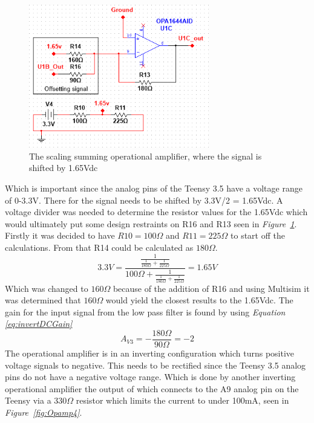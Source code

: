 \begin{figure}[h]
    \centering
    \includegraphics[width=0.70\textwidth]{graphics/OPamp3.png}
    \caption{The scaling summing operational amplifier, where the signal is shifted by 1.65Vdc}
    \label{fig:Opamp3}
\end{figure}


Which is important since the analog pins of the Teensy 3.5 have a voltage range of 0-3.3V.
There for the signal needs to be shifted by 3.3V/2 = 1.65Vdc.
A voltage divider was needed to determine the resistor values for the 1.65Vdc which would ultimately put some design restraints on R16 and R13 seen in \textit{Figure~\ref{fig:Opamp3}}.
Firstly it was decided to have $R10 = 100\Omega$  and $R11 = 225\Omega$ to start off the calculations.
From that R14 could be calculated as $180\Omega$.
$$3.3V = \frac{\frac{1}{\frac{1}{180\Omega}+\frac{1}{225\Omega}}}{100\Omega+\frac{1}{\frac{1}{180\Omega}+\frac{1}{225\Omega}}} = 1.65V$$
Which was changed to $160\Omega$ because of the addition of R16 and using Multisim it was determined that $160\Omega$ would yield the closest results to the 1.65Vdc.
The gain for the input signal from the low pass filter is found by using \textit{Equation \ref{eq:invertDCGain}}
$$A_{V3} = -\frac{180\Omega}{90\Omega} = -2$$
The operational amplifier is in an inverting configuration which turns positive voltage signals to negative.
This needs to be rectified since the Teensy 3.5 analog pins do not have a negative voltage range.
Which is done by another inverting operational amplifier the output of which connects to the A9 analog pin on the Teensy via a 330$\Omega$ resistor which limits the current to under 100mA, seen in \textit{Figure~\ref{fig:Opamp4}}.

